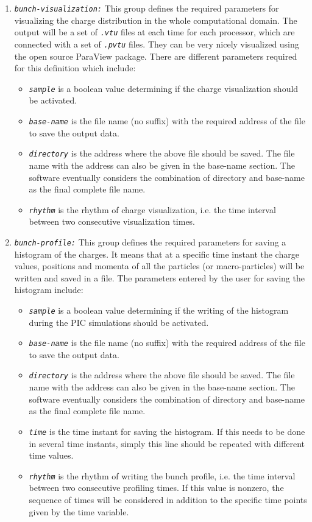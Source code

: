 \begin{enumerate}
\begin{itemize}
\end{itemize}
\item {\tt \small \em bunch-visualization:} This group defines the required parameters for visualizing the charge distribution in the whole computational domain. The output will be a set of {\tt \small \em .vtu} files at each time for each processor, which are connected with a set of {\tt \small \em .pvtu} files. They can be very nicely visualized using the open source ParaView package. There are different parameters required for this definition which include:
%
\begin{itemize}
	\item {\tt \small \em sample} is a boolean value determining if the charge visualization should be activated.
	\item {\tt \small \em base-name} is the file name (no suffix) with the required address of the file to save the output data.
	\item {\tt \small \em directory} is the address where the above file should be saved. The file name with the address can also be given in the base-name section. The software eventually considers the combination of directory and base-name as the final complete file name.
	\item {\tt \small \em rhythm} is the rhythm of charge visualization, i.e. the time interval between two consecutive visualization times.
\end{itemize}
%
\item {\tt \small \em bunch-profile:} This group defines the required parameters for saving a histogram of the charges. It means that at a specific time instant the charge values, positions and momenta of all the particles (or macro-particles) will be written and saved in a file. The parameters entered by the user for saving the histogram include:
%
\begin{itemize}
	\item {\tt \small \em sample} is a boolean value determining if the writing of the histogram during the PIC simulations should be activated.
	\item {\tt \small \em base-name} is the file name (no suffix) with the required address of the file to save the output data.
	\item {\tt \small \em directory} is the address where the above file should be saved. The file name with the address can also be given in the base-name section. The software eventually considers the combination of directory and base-name as the final complete file name.
	\item {\tt \small \em time} is the time instant for saving the histogram. If this needs to be done in several time instants, simply this line should be repeated with different time values.
    \item {\tt \small \em rhythm} is the rhythm of writing the bunch profile, i.e. the time interval between two consecutive profiling times. If this value is nonzero, the sequence of times will be considered in addition to the specific time points given by the time variable.
\end{itemize}
\end{enumerate}

